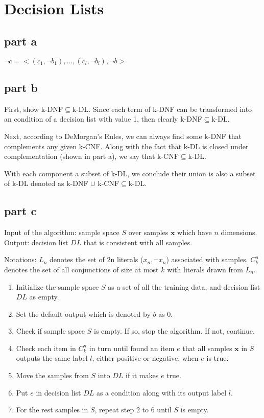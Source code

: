 \section{Decision Lists}

\subsection{part a}
$\neg{c} = <(c_1,\neg{b_1}), ..., (c_l, \neg{b_l}), \neg{b}>$

\subsection{part b}
First, show k-DNF$\subseteq$k-DL. Since each term of k-DNF can be transformed into an condition of a decision list with value 1, then clearly k-DNF$\subseteq$k-DL.

Next, according to DeMorgan's Rules, we can always find some k-DNF that complements any given k-CNF. Along with the fact that k-DL is closed under complementation (shown in part a), we say that k-CNF$\subseteq$k-DL.

With each component a subset of k-DL, we conclude their union is also a subset of k-DL denoted as k-DNF $\cup$ k-CNF$\subseteq$k-DL.

\subsection{part c}
Input of the algorithm: sample space $S$ over samples $\textbf{x}$ which have $n$ dimensions. Output: decision list $DL$ that is consistent with all samples.

Notations: $L_n$ denotes the set of 2n literals ($x_n, \neg{x_n}$) associated with samples. $C_k^n$ denotes the set of all conjunctions of size at most $k$ with literals drawn from $L_n$.

\begin{enumerate}
\item Initialize the sample space $S$ as a set of all the training data, and decision list $DL$ as empty.
\item Set the default output which is denoted by $b$ as 0.
\item Check if sample space $S$ is empty. If so, stop the algorithm. If not, continue.
\item Check each item in $C_k^n$ in turn until found an item $e$ that all samples $\textbf{x}$ in $S$ outputs the same label $l$, either positive or negative, when $e$ is true.
\item Move the samples from $S$ into $DL$ if it makes $e$ true.
\item Put $e$ in decision list $DL$ as a condition along with its output label $l$.
\item For the rest samples in $S$, repeat step 2 to 6 until $S$ is empty.
\end{enumerate}

